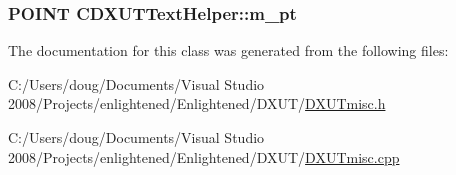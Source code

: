 \label{class_c_d_x_u_t_text_helper_a3c32e301254b6f5473c370b4c567b53b}
\hypertarget{class_c_d_x_u_t_text_helper_af7ee38b69c0c1686a73cb9f52ea492a7}{
\subsubsection[{m\_\-pt}]{\setlength{\rightskip}{0pt plus 5cm}POINT {\bf CDXUTTextHelper::m\_\-pt}}}
\label{class_c_d_x_u_t_text_helper_af7ee38b69c0c1686a73cb9f52ea492a7}


The documentation for this class was generated from the following files:\begin{DoxyCompactItemize}
\item 
C:/Users/doug/Documents/Visual Studio 2008/Projects/enlightened/Enlightened/DXUT/\hyperlink{_d_x_u_tmisc_8h}{DXUTmisc.h}\item 
C:/Users/doug/Documents/Visual Studio 2008/Projects/enlightened/Enlightened/DXUT/\hyperlink{_d_x_u_tmisc_8cpp}{DXUTmisc.cpp}\end{DoxyCompactItemize}

